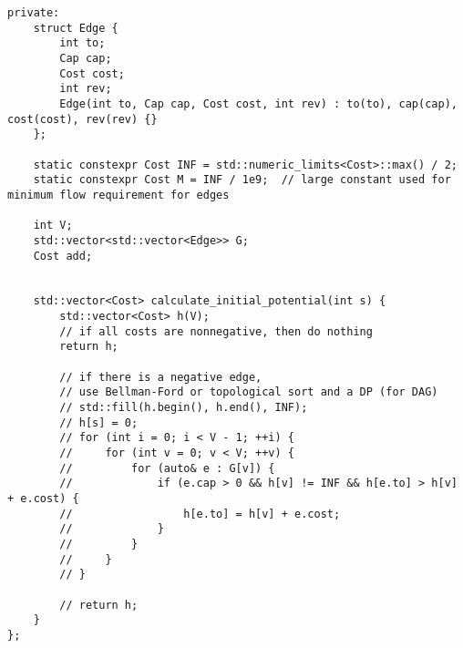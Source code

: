 \begin{lstlisting}
private:
    struct Edge {
        int to;
        Cap cap;
        Cost cost;
        int rev;
        Edge(int to, Cap cap, Cost cost, int rev) : to(to), cap(cap), cost(cost), rev(rev) {}
    };

    static constexpr Cost INF = std::numeric_limits<Cost>::max() / 2;
    static constexpr Cost M = INF / 1e9;  // large constant used for minimum flow requirement for edges

    int V;
    std::vector<std::vector<Edge>> G;
    Cost add;


    std::vector<Cost> calculate_initial_potential(int s) {
        std::vector<Cost> h(V);
        // if all costs are nonnegative, then do nothing
        return h;

        // if there is a negative edge,
        // use Bellman-Ford or topological sort and a DP (for DAG)
        // std::fill(h.begin(), h.end(), INF);
        // h[s] = 0;
        // for (int i = 0; i < V - 1; ++i) {
        //     for (int v = 0; v < V; ++v) {
        //         for (auto& e : G[v]) {
        //             if (e.cap > 0 && h[v] != INF && h[e.to] > h[v] + e.cost) {
        //                 h[e.to] = h[v] + e.cost;
        //             }
        //         }
        //     }
        // }

        // return h;
    }
};

\end{lstlisting}
